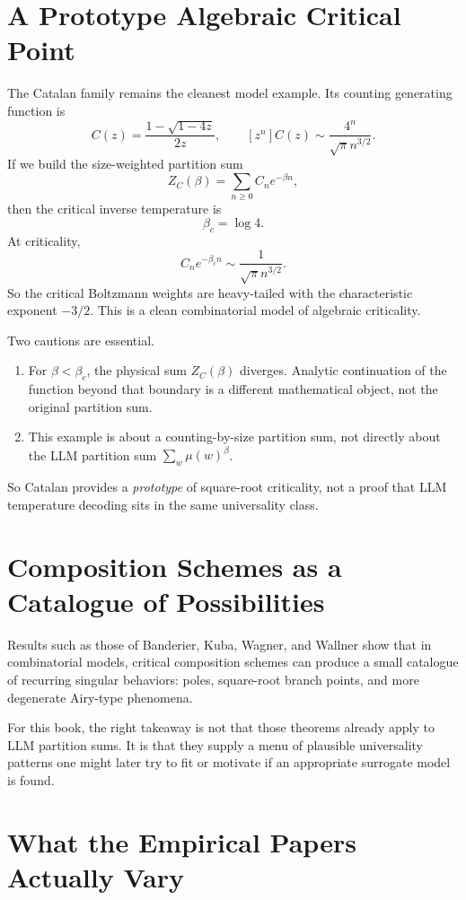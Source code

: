 \section{A Prototype Algebraic Critical Point}

The Catalan family remains the cleanest model example. Its counting generating function is
\[
  C(z) = \frac{1-\sqrt{1-4z}}{2z},
  \qquad
  [z^n]C(z) \sim \frac{4^n}{\sqrt{\pi}n^{3/2}}.
\]
If we build the size-weighted partition sum
\[
  Z_C(\beta) = \sum_{n \ge 0} C_n e^{-\beta n},
\]
then the critical inverse temperature is
\[
  \beta_c = \log 4.
\]
At criticality,
\[
  C_n e^{-\beta_c n} \sim \frac{1}{\sqrt{\pi}n^{3/2}}.
\]
So the critical Boltzmann weights are heavy-tailed with the characteristic exponent $-3/2$. This is a clean combinatorial model of algebraic criticality.

Two cautions are essential.
\begin{enumerate}
  \item For $\beta < \beta_c$, the physical sum $Z_C(\beta)$ diverges. Analytic continuation of the function beyond that boundary is a different mathematical object, not the original partition sum.
  \item This example is about a counting-by-size partition sum, not directly about the LLM partition sum $\sum_w \mu(w)^\beta$.
\end{enumerate}

So Catalan provides a \emph{prototype} of square-root criticality, not a proof that LLM temperature decoding sits in the same universality class.

\section{Composition Schemes as a Catalogue of Possibilities}

Results such as those of Banderier, Kuba, Wagner, and Wallner \cite{BanderierKubaWallner2021} show that in combinatorial models, critical composition schemes can produce a small catalogue of recurring singular behaviors: poles, square-root branch points, and more degenerate Airy-type phenomena.

For this book, the right takeaway is not that those theorems already apply to LLM partition sums. It is that they supply a menu of plausible universality patterns one might later try to fit or motivate if an appropriate surrogate model is found.

\section{What the Empirical Papers Actually Vary}

